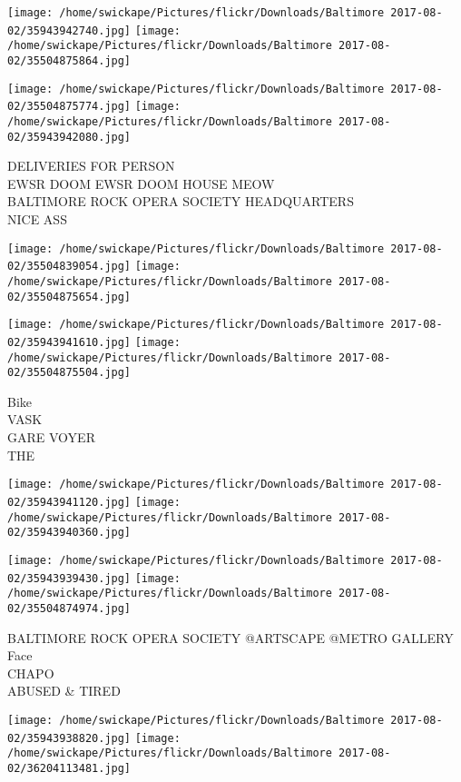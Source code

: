 \documentclass[10pt,letterpaper]{article}
\begin{document}
\texttt{[image: /home/swickape/Pictures/flickr/Downloads/Baltimore 2017-08-02/35943942740.jpg]}
\texttt{[image: /home/swickape/Pictures/flickr/Downloads/Baltimore 2017-08-02/35504875864.jpg]}

\texttt{[image: /home/swickape/Pictures/flickr/Downloads/Baltimore 2017-08-02/35504875774.jpg]}
\texttt{[image: /home/swickape/Pictures/flickr/Downloads/Baltimore 2017-08-02/35943942080.jpg]}

DELIVERIES FOR PERSON\\
EWSR DOOM EWSR DOOM HOUSE MEOW\\
BALTIMORE ROCK OPERA SOCIETY HEADQUARTERS\\
NICE ASS\\
\pagebreak

\texttt{[image: /home/swickape/Pictures/flickr/Downloads/Baltimore 2017-08-02/35504839054.jpg]}
\texttt{[image: /home/swickape/Pictures/flickr/Downloads/Baltimore 2017-08-02/35504875654.jpg]}

\texttt{[image: /home/swickape/Pictures/flickr/Downloads/Baltimore 2017-08-02/35943941610.jpg]}
\texttt{[image: /home/swickape/Pictures/flickr/Downloads/Baltimore 2017-08-02/35504875504.jpg]}

Bike\\
VASK\\
GARE VOYER\\
THE\\
\pagebreak

\texttt{[image: /home/swickape/Pictures/flickr/Downloads/Baltimore 2017-08-02/35943941120.jpg]}
\texttt{[image: /home/swickape/Pictures/flickr/Downloads/Baltimore 2017-08-02/35943940360.jpg]}

\texttt{[image: /home/swickape/Pictures/flickr/Downloads/Baltimore 2017-08-02/35943939430.jpg]}
\texttt{[image: /home/swickape/Pictures/flickr/Downloads/Baltimore 2017-08-02/35504874974.jpg]}

BALTIMORE ROCK OPERA SOCIETY @ARTSCAPE @METRO GALLERY\\
Face\\
CHAPO\\
ABUSED \& TIRED\\
\pagebreak

\texttt{[image: /home/swickape/Pictures/flickr/Downloads/Baltimore 2017-08-02/35943938820.jpg]}
\texttt{[image: /home/swickape/Pictures/flickr/Downloads/Baltimore 2017-08-02/36204113481.jpg]}
\end{document}
